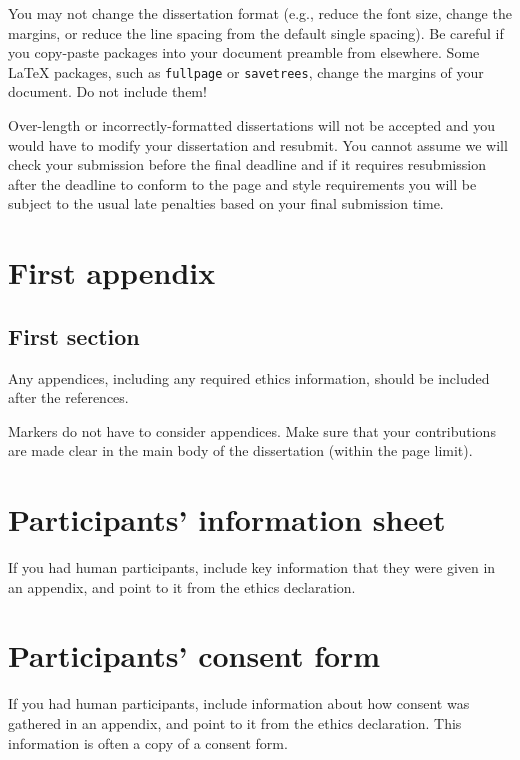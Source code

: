 \documentclass[logo,bsc,singlespacing,parskip]{infthesis}
\begin{document}
You may not change the dissertation format (e.g., reduce the font size, change
the margins, or reduce the line spacing from the default single spacing). Be
careful if you copy-paste packages into your document preamble from elsewhere.
Some \LaTeX{} packages, such as \texttt{fullpage} or \texttt{savetrees}, change
the margins of your document. Do not include them!

Over-length or incorrectly-formatted dissertations will not be accepted and you
would have to modify your dissertation and resubmit. You cannot assume we will
check your submission before the final deadline and if it requires resubmission
after the deadline to conform to the page and style requirements you will be
subject to the usual late penalties based on your final submission time.





\appendix

\chapter{First appendix}

\section{First section}

Any appendices, including any required ethics information, should be included
after the references.

Markers do not have to consider appendices. Make sure that your contributions
are made clear in the main body of the dissertation (within the page limit).

\chapter{Participants' information sheet}

If you had human participants, include key information that they were given in
an appendix, and point to it from the ethics declaration.

\chapter{Participants' consent form}

If you had human participants, include information about how consent was
gathered in an appendix, and point to it from the ethics declaration.
This information is often a copy of a consent form.
\end{document}
